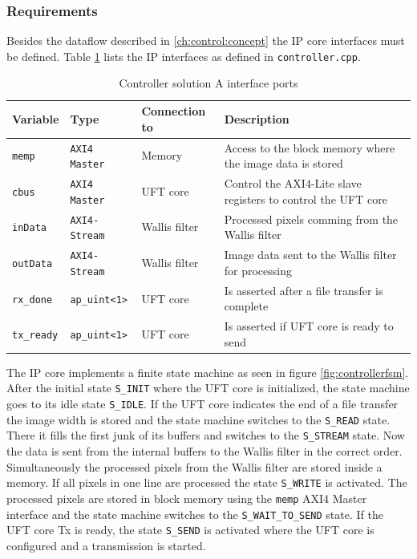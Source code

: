 \subsubsection*{Requirements}
Besides the dataflow described in \ref{ch:control:concept} the IP core
interfaces must be defined. Table \ref{tab:controlleraports} lists the IP
interfaces as defined in \texttt{controller.cpp}.

\begin{table}[b!]
    \centering
    \begin{tabular}{l l l p{8cm}}
        \toprule
        Variable & Type & Connection to & Description \\
        \midrule
        \texttt{memp} & \texttt{AXI4 Master} & Memory &
        Access to the block memory where the image data is stored
        \\
        \texttt{cbus} & \texttt{AXI4 Master} \footnotemark & UFT core &
        Control the AXI4-Lite slave registers to control the UFT core
        \\
        \texttt{inData} & \texttt{AXI4-Stream} & Wallis filter &
        Processed pixels comming from the Wallis filter
        \\
        \texttt{outData} & \texttt{AXI4-Stream} & Wallis filter &
        Image data sent to the Wallis filter for processing
        \\
        \texttt{rx\_done} & \texttt{ap\_uint<1>} & UFT core &
        Is asserted after a file transfer is complete
        \\
        \texttt{tx\_ready} & \texttt{ap\_uint<1>} & UFT core &
        Is asserted if UFT core is ready to send
        \\
        \bottomrule
    \end{tabular}
    \caption{Controller solution A interface ports}
    \label{tab:controlleraports}
\end{table}

The IP core implements a finite state machine as seen in figure 
\ref{fig:controllerfsm}. After the initial state
\texttt{S\_INIT} where the UFT core is initialized, the state machine goes to its
idle state \texttt{S\_IDLE}. If the UFT core indicates the end of a file
transfer the image width is stored and the state machine switches to the 
\texttt{S\_READ} state. There it fills the first junk of its buffers and
switches to the \texttt{S\_STREAM} state. Now the data is sent from the
internal buffers to the Wallis filter in the correct order. Simultaneously the
processed pixels from the Wallis filter are stored inside a memory. If all
pixels in one line are processed the state \texttt{S\_WRITE} is activated. The
processed pixels are stored in block memory using the \texttt{memp} AXI4 Master
interface and the state machine switches to the \texttt{S\_WAIT\_TO\_SEND}
state. If the UFT core Tx is ready, the state \texttt{S\_SEND} is activated
where the UFT core is configured and a transmission is started.

